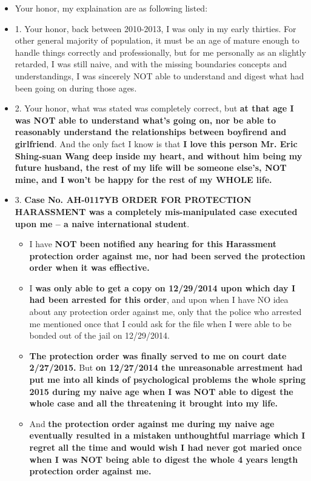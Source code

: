 \documentclass[9pt, b5paper]{article}
\begin{document}
\begin{itemize}
\item Your honor, my explaination are as following listed:
\item 1. Your honor, back between 2010-2013, I was only in my early thirties. For other general majority of population, it must be an age of mature enough to handle things correctly and professionally, but for me personally as an slightly retarded, I was still naive, and with the missing boundaries concepts and understandings, I was sincerely NOT able to understand and digest what had been going on during those ages.
\item 2. Your honor, what was stated was completely correct, but \textbf{at that age I was NOT able to understand what's going on, nor be able to reasonably understand the relationships between boyfirend and girlfriend}. And the only fact I know is that \textbf{I love this person Mr. Eric Shing-suan Wang deep inside my heart, and without him being my future husband, the rest of my life will be someone else's, NOT mine, and I won't be happy for the rest of my WHOLE life.}
\item 3. \textbf{Case No. AH-0117YB ORDER FOR PROTECTION HARASSMENT was a completely mis-manipulated case executed upon me -- a naive international student}. 
\begin{itemize}
\item I have \textbf{NOT been notified any hearing for this Harassment protection order against me, nor had been served the protection order when it was effiective.}
\item I \textbf{was only able to get a copy on 12/29/2014 upon which day I had been arrested for this order}, and upon when I have NO idea about any protection order against me, only that the police who arrested me mentioned once that I could ask for the file when I were able to be bonded out of the jail on 12/29/2014.
\item \textbf{The protection order was finally served to me on court date 2/27/2015.} But \textbf{on 12/27/2014 the unreasonable arrestment had put me into all kinds of psychological problems the whole spring 2015 during my naive age when I was NOT able to digest the whole case and all the threatening it brought into my life.}
\item And \textbf{the protection order against me during my naive age eventually resulted in a mistaken unthoughtful marriage which I regret all the time and would wish I had never got maried once when I was NOT being able to digest the whole 4 years length protection order against me.}

\end{itemize}
\end{itemize}
\end{document}
